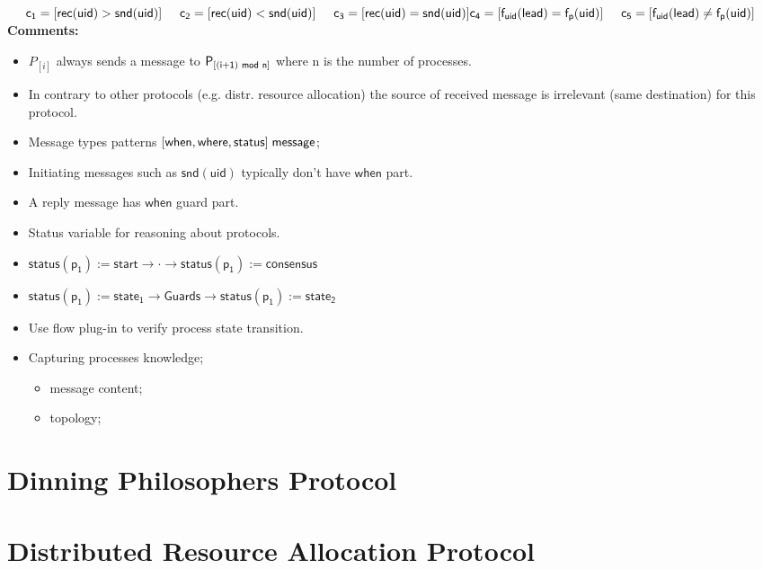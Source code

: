 \documentclass[10pt,a4paper]{report}
\begin{document}
		\noindent{} \\
	
	$\mathsf{\hspace{.5cm} c_1 = [rec(uid) > snd(uid)]} \hspace{.5cm} \mathsf{c_2 = [rec(uid) < snd(uid)]} \hspace{.5cm}\vspace{.2cm} \mathsf{c_3 = [rec(uid) = snd(uid)]}\hspace{.5cm} \\  \mathsf{c_4 = [f_{uid}(lead) = f_{p}(uid)]} \hspace{.5cm} \mathsf{c_5 = [f_{uid}(lead) \neq f_{p}(uid)]}$ \\
	

	
	\pagebreak
	\noindent \textbf{Comments:}
	
	\begin{itemize}
		\item $P_{[i]}$ always sends a message to $\mathsf{P_{[(i+1) \hspace{.1cm} mod \hspace{.1cm} n]}}$ where n is the number of processes.
		\item In contrary to other protocols (e.g. distr. resource allocation) the source of received message is irrelevant (same destination) for this protocol.
	
			\item Message types patterns $\mathsf{[when, where, status] \hspace*{.1cm} message}$;
	
			\item Initiating messages such as $\mathsf{snd(uid)}$ typically don't have $\mathsf{when}$ part.
			\item A reply message has $\mathsf{when}$ guard part.
			\item Status variable for reasoning about protocols.
			\item $\mathsf{status(p_1) := start \rightarrow \cdot \rightarrow status(p_1) := consensus}$
			\item $\mathsf{status(p_1) := state_1 \rightarrow Guards \rightarrow status(p_1) := state_2}$
			\item Use flow plug-in to verify process state transition.
				\item Capturing processes knowledge;
				\begin{itemize}
					\item message content;
					\item topology;
				\end{itemize}

	\end{itemize}
	
	\newpage
	\section*{Dinning Philosophers Protocol}
	
	\newpage
	\section*{Distributed Resource Allocation Protocol}
\end{document}
